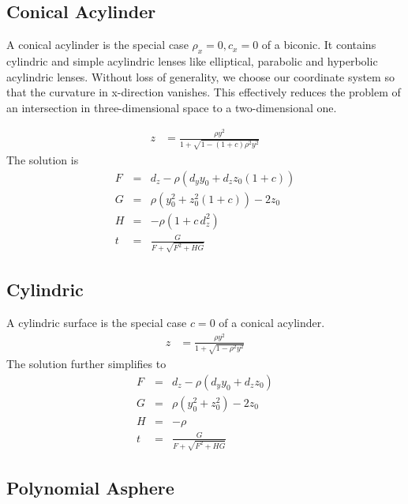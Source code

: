 \documentclass[12pt,a4paper,twoside,openright,BCOR10mm,headsepline,titlepage,abstracton,chapterprefix,final]{scrreprt}
\begin{document}
\subsection{Conical Acylinder}
A conical acylinder is the special case $\rho_x=0, c_x=0$ of a biconic. It contains cylindric and simple acylindric lenses like elliptical, parabolic and hyperbolic acylindric lenses.
Without loss of generality, we choose our coordinate system so that the curvature in x-direction vanishes.
This effectively reduces the problem of an intersection in three-dimensional space to a two-dimensional one.

\begin{align}
 z &= \frac{ \rho y^2}{1 + \sqrt{1 - (1+c) \rho^2 y^2}}
\end{align}
The solution is
\begin{eqnarray}
   F &=& d_z - \rho \left(  d_y y_0 + d_z z_0 (1+c) \right) \\
   G &=& \rho ( y_0^2 + z_0^2 (1+c)) - 2 z_0 \\
   H &=& - \rho ( 1 + c \, d_z^2 ) \\
   t &=& \frac{G}{ F + \sqrt{F^2 + H G} }
\end{eqnarray}


\subsection{Cylindric}
A cylindric surface is the special case $c = 0$ of a conical acylinder.
\begin{align}
 z &= \frac{ \rho y^2}{1 + \sqrt{1 - \rho^2 y^2}}
\end{align}
The solution further simplifies to
\begin{eqnarray}
   F &=& d_z - \rho \left(  d_y y_0 + d_z z_0  \right) \\
   G &=& \rho ( y_0^2 + z_0^2 ) - 2 z_0 \\
   H &=& - \rho \\
   t &=& \frac{G}{ F + \sqrt{F^2 + H G} }
\end{eqnarray}


\subsection{Polynomial Asphere}
\end{document}
